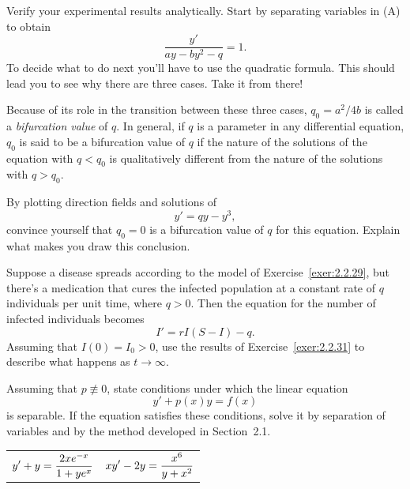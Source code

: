 \begin{exerciselist}
\begin{alist}
    \item %
    Verify your experimental results analytically. Start by separating variables in (A) to obtain
    \[
      \frac{y'}{ay-by^{2}-q}=1.
    \]
    To decide what to do next you'll have to use the quadratic formula. This should lead you to see
    why there are three cases. Take it from there!

    Because of its role in the transition between these three cases, $q_{0}=a^{2}/4b$ is called a
    {\color{blue}\it bifurcation value\/} of $q$. In general, if $q$ is a parameter in any
    differential equation, $q_{0}$ is said to be a bifurcation value of $q$ if the nature of the
    solutions of the equation with $q<q_{0}$ is qualitatively different from the nature of the
    solutions with $q>q_{0}$.
  \end{alist}

  \item\label{exer:2.2.32} \Lex By plotting direction fields and solutions of
  \[
    y'=qy-y^{3},
  \]
  convince yourself that $q_{0}=0$ is a bifurcation value of $q$ for this equation. Explain what
  makes you draw this conclusion.

  \item\label{exer:2.2.33} Suppose a disease spreads according to the model of
        Exercise~\ref{exer:2.2.29}, but there's a medication that cures the infected population at a
        constant rate of $q$ individuals per unit time, where $q>0$. Then the equation for the
        number of infected individuals becomes
  \[
    I'=rI(S-I)-q.
  \]
  Assuming that $I(0)=I_{0}>0$, use the results of Exercise~\ref{exer:2.2.31} to describe what
  happens as $t\to\infty$.

  \item\label{exer:2.2.34} Assuming that $p\not\equiv0$, state conditions under which the linear
        equation
  \[
    y'+p(x)y=f(x)
  \]
  is separable. If the equation satisfies these conditions, solve it by separation of variables and
  by the method developed in Section~2.1.


  \begin{tabular}[t]{@{}p{168pt}@{}p{168pt}}
    \item\label{exer:2.2.35} $\displaystyle{y'+y=\frac{2xe^{-x}}{1+ye^{x}}}$ &
    \item\label{exer:2.2.36}\vspace*{7pt} $\displaystyle{xy'-2y=\frac{x^{6}}{y+x^{2}}}$
  \end{tabular}


\end{exerciselist}
